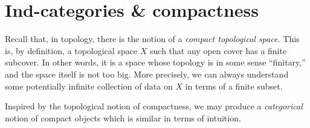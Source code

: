 
\section{Ind-categories \& compactness}
Recall that, in topology, there is the notion of a \emph{compact topological space.} This is, by definition, a topological space \(X\) such that any open cover has a finite subcover. In other words,
it is a space whose topology is in some sense ``finitary,'' and the space itself is not too big. More precisely, we can always understand some potentially infinite collection of data on \(X\)
in terms of a finite subset.

Inspired by the topological notion of compactness, we may produce a \emph{categorical} notion of compact objects which is similar in terms of intuition.

